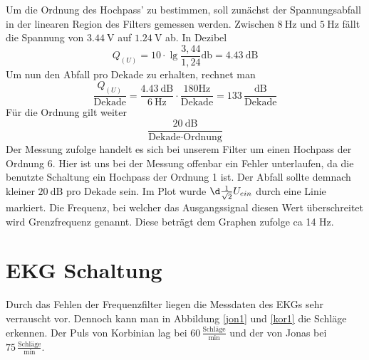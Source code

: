 Um die Ordnung des Hochpass' zu bestimmen, soll zunächst der Spannungsabfall in
der linearen Region des Filters gemessen werden. Zwischen $\SI{8}{\hertz}$ und $\SI{5}{\hertz}$
fällt die Spannung von $\SI{3,44}{\volt}$ auf $\SI{1,24}{\volt}$ ab. In
Dezibel
\[
Q_{(U)} = 10 \cdot \lg \frac{3,44}{1,24} \si{\decibel} = \SI{4,43}{\dB}
\]
Um nun den Abfall pro Dekade zu erhalten, rechnet man
\[
\frac{Q_{(U)} }{\text{Dekade}} = \frac{ \SI{4,43}{\dB} }{ \SI{6}
{\Hz}} \cdot \frac{ 180 \text{Hz} }{\text{Dekade}} = 133 \, \frac{
\si{\dB}}{\text{Dekade}}
\]
Für die Ordnung gilt weiter
\[
\frac{ \SI{20}{\dB} }{\text{Dekade} \cdot \text{Ordnung} }
\]
Der Messung zufolge handelt es sich bei unserem Filter um einen Hochpass der Ordnung 6.
Hier ist uns bei der Messung offenbar ein Fehler unterlaufen, da die benutzte 
Schaltung ein Hochpass der Ordnung 1 ist. Der Abfall sollte demnach kleiner
$\SI{20}{\dB}$ pro Dekade sein.
Im Plot wurde $\d \frac{1}{\sqrt{2}} U_{ein}$ durch eine Linie markiert.
Die Frequenz, bei welcher das Ausgangssignal diesen Wert überschreitet wird
Grenzfrequenz genannt. Diese beträgt dem Graphen zufolge ca 14 Hz. 

\section{EKG Schaltung}

Durch das Fehlen der Frequenzfilter liegen die Messdaten des EKGs sehr
verrauscht vor. Dennoch kann man in Abbildung \ref{jon1} und \ref{kor1} die
Schläge erkennen. 
Der Puls von Korbinian lag bei $60 \, \frac{ \text{Schläge}}{\text{min}}$ und der von
Jonas bei $75 \, \frac{\text{Schläge}}{\text{min}}$.

